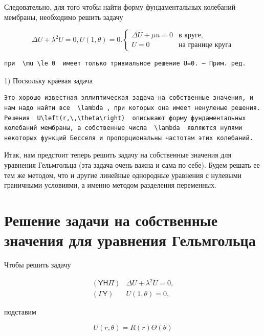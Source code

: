 \documentclass[
  ukrainian,
]{article}
\begin{document}
Следовательно, для того чтобы найти форму фундаментальных колебаний
мембраны, необходимо решить задачу

\[
\Delta U + \lambda^2 U = 0,
U(1, \theta) = 0.
\begin{cases} \Delta U + \mu u = 0 & \text{в круге,} \\ U = 0 & \text{на границе круга} \end{cases}
\]

\begin{verbatim}
при  \mu \le 0  имеет только тривиальное решение U=0. — Прим. ред.
\end{verbatim}

1) Поскольку краевая задача

\begin{verbatim}
Это хорошо известная эллиптическая задача на собственные значения, и нам надо найти все  \lambda , при которых она имеет ненуленые решения. Решения  U\left(r,\,\theta\right)  описывают форму фундаментальных колебаний мембраны, а собственные числа  \lambda  являются нулями некоторых функций Бесселя и пропорциональны частотам этих колебаний.
\end{verbatim}

Итак, нам предстоит теперь решить задачу на собственные значения для
уравнения Гельмгольца (эта задача очень важна и сама по себе). Будем
решать ее тем же методом, что и другие линейные однородные уравнения с
нулевыми граничными условиями, а именно методом разделения переменных.

\section{Решение задачи на собственные значения для уравнения
Гельмгольца}\label{ux440ux435ux448ux435ux43dux438ux435-ux437ux430ux434ux430ux447ux438-ux43dux430-ux441ux43eux431ux441ux442ux432ux435ux43dux43dux44bux435-ux437ux43dux430ux447ux435ux43dux438ux44f-ux434ux43bux44f-ux443ux440ux430ux432ux43dux435ux43dux438ux44f-ux433ux435ux43bux44cux43cux433ux43eux43bux44cux446ux430}

Чтобы решить задачу

\[
\begin{array}{ll} (\mathsf{Y}\mathsf{H}\mathsf{\Pi}) & \Delta U + \lambda^2 U = 0, \\ (\mathsf{\Gamma}\mathsf{Y}) & U(1, \theta) = 0, \end{array}
\]

подставим

\[
U(r, \theta) = R(r) \Theta(\theta)
\]
\end{document}
